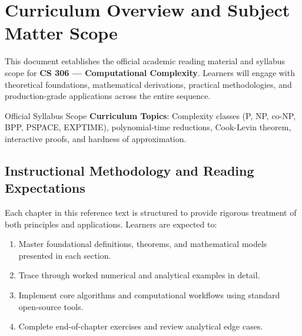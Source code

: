 \section{Curriculum Overview and Subject Matter Scope}

This document establishes the official academic reading material and syllabus scope for \textbf{CS 306 --- Computational Complexity}. Learners will engage with theoretical foundations, mathematical derivations, practical methodologies, and production-grade applications across the entire sequence.

\begin{InsightBox}{Official Syllabus Scope}
  \textbf{Curriculum Topics}: Complexity classes (P, NP, co-NP, BPP, PSPACE, EXPTIME), polynomial-time reductions, Cook-Levin theorem, interactive proofs, and hardness of approximation.
\end{InsightBox}

\subsection{Instructional Methodology and Reading Expectations}

Each chapter in this reference text is structured to provide rigorous treatment of both principles and applications. Learners are expected to:
\begin{enumerate}
  \item Master foundational definitions, theorems, and mathematical models presented in each section.
  \item Trace through worked numerical and analytical examples in detail.
  \item Implement core algorithms and computational workflows using standard open-source tools.
  \item Complete end-of-chapter exercises and review analytical edge cases.
\end{enumerate}

